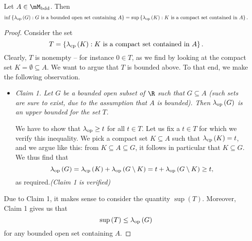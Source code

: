 \documentclass[pmath450]{subfiles}
\begin{document}
    \begin{prop}{}
        Let $A\in\mM_{\bdd}$. Then
        \begin{equation}
            \inf\left\lbrace \lambda_{\operatorname{op}}\left( G \right): \text{$G$ is a bounded open set containing $A$} \right\rbrace = 
            \sup\left\lbrace \lambda_{\operatorname{op}}\left( K \right): \text{$K$ is a compact set contained in $A$} \right\rbrace.
        \end{equation}
    \end{prop}

    \begin{proof}
        Consider the set
        \begin{equation*}
            T = \left\lbrace \lambda_{\operatorname{cp}}\left( K \right): K\text{ is a compact set contained in $A$} \right\rbrace.
        \end{equation*}
        Clearly, $T$ is nonempty -- for instance $0\in T$, as we find by looking at the compact set $K=\emptyset\subseteq A$. We want to argue that $T$ is bounded above. To that end, we make the following observation.

        \begin{itemize}
            \item \textit{Claim 1. Let $G$ be a bounded open subset of $\R$ such that $G\subseteq A$ (such sets are sure to exist, due to the assumption that $A$ is bounded). Then $\lambda_{\operatorname{op}}\left( G \right)$ is an upper bounded for the set $T$.}

                \begin{subproof}
                    We have to show that $\lambda_{\operatorname{op}}\geq t$ for all $t\in T$. Let us fix a $t\in T$ for which we verify this inequality. We pick a compact set $K\subseteq A$ such that $\lambda_{\operatorname{cp}}\left( K \right)=t$, and we argue like this: from $K\subseteq A\subseteq G$, it follows in particular that $K\subseteq G$. We thus find that
                    \begin{equation*}
                        \lambda_{\operatorname{op}}\left( G \right) = \lambda_{\operatorname{cp}}\left( K \right)+\lambda_{\operatorname{op}}\left( G\setminus K \right) = t+\lambda_{\operatorname{op}}\left( G\setminus K \right)\geq t,
                    \end{equation*}
                    as required.\hfill\textit{(Claim 1 is verified)}
                \end{subproof}
        \end{itemize} 

        Due to Claim 1, it makes sense to consider the quantity $\sup\left( T \right)$. Moreover, Claim 1 gives us that
        \begin{equation}
            \sup\left( T \right)\leq\lambda_{\operatorname{op}}\left( G \right)
        \end{equation}
        for any bounded open set containing $A$. 


\end{proof}
\end{document}
